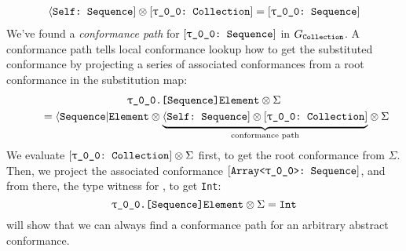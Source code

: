 \documentclass[../generics]{subfiles}
\begin{document}
\begin{example}
\begin{gather*}
\SelfSequence \otimes \rTCollection = \rTSequence
\end{gather*}
We've found a \emph{conformance path} for $\rTSequence$ in $G_{\texttt{Collection}}$. A conformance path tells local conformance lookup how to get the substituted conformance by projecting a series of associated conformances from a root conformance in the substitution map:
\begin{gather*}
\texttt{\rT.[Sequence]Element} \otimes \Sigma \\
\qquad {} = \AElement \otimes {\underbrace{\SelfSequence \otimes \rTCollection\strut}_{\text{conformance path}}} \otimes \Sigma
\end{gather*}
We evaluate $\rTCollection \otimes \Sigma$ first, to get the root conformance from $\Sigma$. Then, we project the associated conformance $\ConfReq{Array<\rT>}{Sequence}$, and from there, the type witness for \nElement, to get \texttt{Int}:
\[\texttt{\rT.[Sequence]Element} \otimes \Sigma = \texttt{Int}\]
 will show that we can always find a conformance path for an arbitrary abstract conformance.
\end{example}
\end{document}
